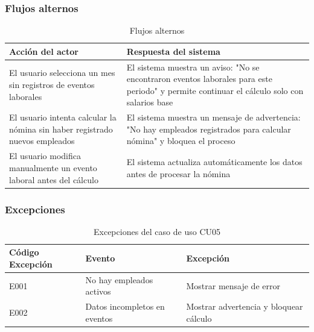 \subsubsection*{Flujos alternos}

\begin{table}[h]
	\centering
	\caption{Flujos alternos}
	\begin{tabular}{|p{7cm}|p{7cm}|}
		\hline
		\textbf{Acción del actor}                                                   & \textbf{Respuesta del sistema}                                                                                                             \\ \hline
		El usuario selecciona un mes sin registros de eventos laborales             & El sistema muestra un aviso: "No se encontraron eventos laborales para este periodo" y permite continuar el cálculo solo con salarios base \\ \hline
		El usuario intenta calcular la nómina sin haber registrado nuevos empleados & El sistema muestra un mensaje de advertencia: "No hay empleados registrados para calcular nómina" y bloquea el proceso                     \\ \hline
		El usuario modifica manualmente un evento laboral antes del cálculo         & El sistema actualiza automáticamente los datos antes de procesar la nómina                                                                 \\ \hline
	\end{tabular}
\end{table}

\clearpage

\subsubsection*{Excepciones}

\begin{table}[h]
	\centering
	\caption{Excepciones del caso de uso CU05}
	\begin{tabular}{|p{4cm}|p{6cm}|p{6cm}|}
		\hline
		\textbf{Código Excepción} & \textbf{Evento}              & \textbf{Excepción}                     \\ \hline
		E001                      & No hay empleados activos     & Mostrar mensaje de error               \\ \hline
		E002                      & Datos incompletos en eventos & Mostrar advertencia y bloquear cálculo \\ \hline
	\end{tabular}
\end{table}

